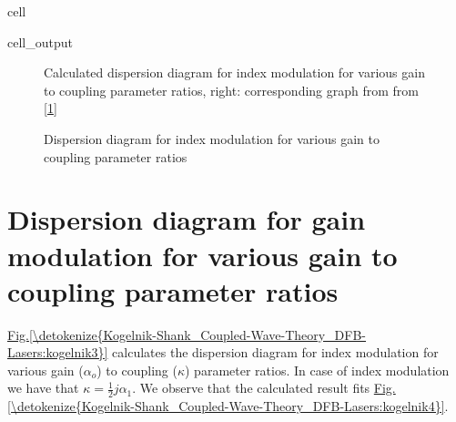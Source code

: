 \documentclass[a4paper,10pt,english,openany,oneside]{jupyterBook}
\begin{document}
\begin{sphinxuseclass}{cell}\begin{sphinxVerbatimOutput}

\begin{sphinxuseclass}{cell_output}
\begin{figure}[htbp]
\centering
\capstart

\noindent{}
\caption{Calculated dispersion diagram for index modulation for various gain to coupling parameter ratios, right: corresponding graph from from {[}\hyperlink{cite.bib:id3}{1}{]}}\label{\detokenize{Kogelnik-Shank_Coupled-Wave-Theory_DFB-Lasers:kogelnik1}}\end{figure}

\end{sphinxuseclass}\end{sphinxVerbatimOutput}

\end{sphinxuseclass}
\begin{figure}[htbp]
\centering
\capstart

\noindent{}
\caption{Dispersion diagram for index modulation for various gain to coupling parameter ratios}\label{\detokenize{Kogelnik-Shank_Coupled-Wave-Theory_DFB-Lasers:kogelnik2}}\end{figure}


\section{Dispersion diagram for gain modulation for various gain to coupling parameter ratios}
\label{\detokenize{Kogelnik-Shank_Coupled-Wave-Theory_DFB-Lasers:dispersion-diagram-for-gain-modulation-for-various-gain-to-coupling-parameter-ratios}}
\sphinxAtStartPar
\hyperref[\detokenize{Kogelnik-Shank_Coupled-Wave-Theory_DFB-Lasers:kogelnik3}]{Fig.\@ \ref{\detokenize{Kogelnik-Shank_Coupled-Wave-Theory_DFB-Lasers:kogelnik3}}} calculates the dispersion diagram for index modulation for various gain (\(\alpha_o\)) to coupling (\(\kappa\)) parameter ratios. In case of index modulation we have that \(\kappa= \frac{1}{2} j \alpha_1\). We observe that the calculated result fits \hyperref[\detokenize{Kogelnik-Shank_Coupled-Wave-Theory_DFB-Lasers:kogelnik4}]{Fig.\@ \ref{\detokenize{Kogelnik-Shank_Coupled-Wave-Theory_DFB-Lasers:kogelnik4}}}.
\end{document}
